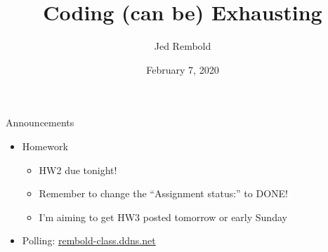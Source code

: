 \documentclass[pdf, aspectratio=169, 12pt]{beamer}
\title{Coding (can be) Exhausting}
\author{Jed Rembold}
\date{February 7, 2020}
\begin{document}
\begin{frame}{Announcements}
	\begin{itemize}
		\item Homework
			\begin{itemize}
				\item HW2 due tonight!
				\item Remember to change the ``Assignment status:'' to DONE!
				\item I'm aiming to get HW3 posted tomorrow or early Sunday
			\end{itemize}
		\item Polling: \url{rembold-class.ddns.net}
	\end{itemize}
\end{frame}




\end{document}
